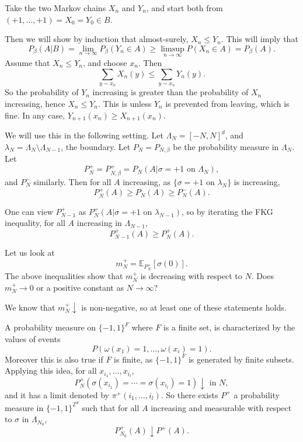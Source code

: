 \documentclass[12pt]{article}
\begin{document}
\begin{proofbox}
	Take the two Markov chains $X_n$ and $Y_n$, and start both from $(+1, \ldots, +1) = X_0 = Y_0 \in B$.

	Then we will show by induction that almost-surely, $X_n \leq Y_n$. This will imply that
	\[
	P_\beta(A | B) = \lim_{n \to \infty}P_\beta(Y_n \in A) \geq \limsup_{n \to \infty} P(X_n \in A) = P_\beta(A).
	\]
	Assume that $X_n \leq Y_n$, and choose $x_n$. Then
	\[
	\sum_{y \sim x_n} X_n(y) \leq \sum_{y \sim x_n} Y_n(y).
	\]
	So the probability of $Y_n$ increasing is greater than the probability of $X_n$ increasing, hence $X_n \leq Y_n$. This is unless $Y_n$ is prevented from leaving, which is fine. In any case, $Y_{n+1}(x_n) \geq X_{n+1}(x_n)$.
\end{proofbox}

We will use this in the following setting. Let $\Lambda_N = [-N, N]^{d}$, and $\lambda_N = \Lambda_N \setminus \Lambda_{N-1}$, the boundary. Let $P_N = P_{N, \beta}$ be the probability measure in $\Lambda_N$. Let
\[
P_N^{+} = P_{N, \beta}^{+} = P_N(A | \sigma = +1 \text{ on } \Lambda_N),
\]
and $P_N^{-}$ similarly. Then for all $A$ increasing, as $\{\sigma = +1 \text{ on } \lambda_N\}$ is increasing,
\[
P_N^{+}(A) \geq P_N(A) \geq P_N^{-}(A).
\]
\begin{remark}
	One can view $P_{N-1}^{+}$ as $P_N^{+}(A | \sigma = +1 \text{ on } \lambda_{N-1})$, so by iterating the FKG inequality, for all $A$ increasing in $\Lambda_{N-1}$,
	\[
	P_{N-1}^{+}(A) \geq P_N^{+}(A).
	\]
\end{remark}

Let us look at
\[
m_N^{+} = \mathbb{E}_{P_N^{+}}[\sigma(0)].
\]
The above inequalities show that $m_N^{+}$ is decreasing with respect to $N$. Does $m_N^{+} \to 0$ or a positive constant as $N \to \infty$?

We know that $m_N^{+} \downarrow$ is non-negative, so at least one of these statements holds.

A probability measure on $\{-1, 1\}^{F}$ where $F$ is a finite set, is characterized by the values of events
\[
P(\omega(x_1) = 1, \ldots, \omega(x_i) = 1).
\]
Moreover this is also true if $F$ is finite, as $\{-1, 1\}^{F}$ is generated by finite subsets. Applying this idea, for all $x_{i_1}, \ldots, x_{i_l}$,
\[
	P_N^{+}(\sigma(x_{i_1}) = \cdots = \sigma(x_{i_l}) = 1) \downarrow \text{ in } N,
\]
and it has a limit denoted by $\pi^{+}(i_1, \ldots, i_l)$. So there exists $P^{+}$ a probability measure in $\{-1, 1\}^{\mathbb{Z}^{d}}$ such that for all $A$ increasing and measurable with respect to $\sigma$ in $\Lambda_{N_0}$,
\[
P_{N_0}^{+}(A) \downarrow P^{+}(A).
\]
\end{document}
